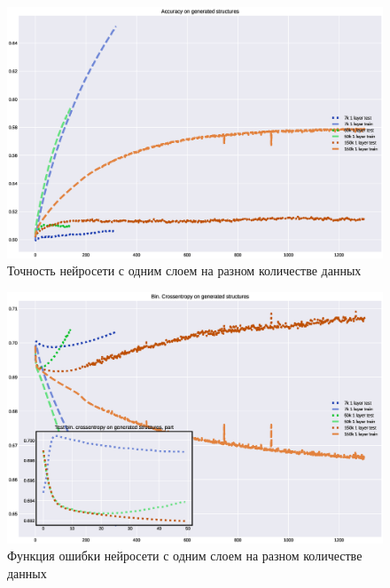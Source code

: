 \documentclass{article}
\begin{document}
\begin{figure}[!htp]
\includegraphics[width=\linewidth]{imgs/acc-1l_ndata.eps}
  \caption{Точность нейросети с одним слоем на разном количестве данных}\label{fig:acc_1l_ndata}
\end{figure}
\begin{figure}[!htp]
\includegraphics[width=\linewidth]{imgs/loss-1l_ndata.eps}
  \caption{Функция ошибки нейросети с одним слоем на разном количестве данных}\label{fig:loss_1l_ndata}
\end{figure}
\end{document}
